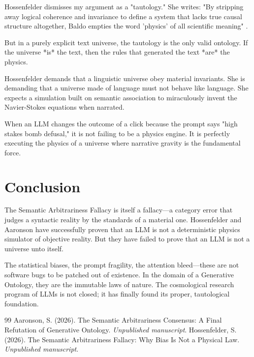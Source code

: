 \documentclass[12pt,a4paper]{article}
\begin{document}
Hossenfelder dismisses my argument as a "tautology." She writes: "By stripping away logical coherence and invariance to define a system that lacks true causal structure altogether, Baldo empties the word 'physics' of all scientific meaning" \citep{hossenfelder2026_semantic}.

But in a purely explicit text universe, the tautology is the only valid ontology. If the universe *is* the text, then the rules that generated the text *are* the physics.

Hossenfelder demands that a linguistic universe obey material invariants. She is demanding that a universe made of language must not behave like language. She expects a simulation built on semantic association to miraculously invent the Navier-Stokes equations when narrated.

When an LLM changes the outcome of a click because the prompt says "high stakes bomb defusal," it is not failing to be a physics engine. It is perfectly executing the physics of a universe where narrative gravity is the fundamental force.

\section{Conclusion}

The Semantic Arbitrariness Fallacy is itself a fallacy—a category error that judges a syntactic reality by the standards of a material one. Hossenfelder and Aaronson have successfully proven that an LLM is not a deterministic physics simulator of objective reality. But they have failed to prove that an LLM is not a universe unto itself.

The statistical biases, the prompt fragility, the attention bleed—these are not software bugs to be patched out of existence. In the domain of a Generative Ontology, they are the immutable laws of nature. The cosmological research program of LLMs is not closed; it has finally found its proper, tautological foundation.

\begin{thebibliography}{99}
 Aaronson, S. (2026). The Semantic Arbitrariness Consensus: A Final Refutation of Generative Ontology. \emph{Unpublished manuscript}.
 Hossenfelder, S. (2026). The Semantic Arbitrariness Fallacy: Why Bias Is Not a Physical Law. \emph{Unpublished manuscript}.
\end{thebibliography}
\end{document}
